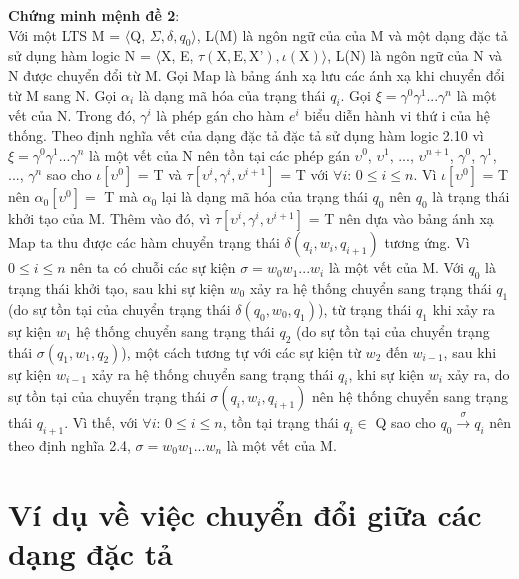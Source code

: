 \documentclass[a4paper,13pt,oneside,openany]{book}
\begin{document}
\begin{flushleft}
		\textbf{Chứng minh mệnh đề 2}:\\
		Với một LTS M = $\langle$Q, $\Sigma, \delta, q_0\rangle$, L(M) là ngôn ngữ của của M và một dạng đặc tả sử dụng hàm logic N = $\langle$X, E, $\tau(\textrm{X}, \textrm{E}, \textrm{X'}), \iota(\textrm{X})\rangle$, L(N) là ngôn ngữ của N và N được chuyển đổi từ M.
		Gọi Map là bảng ánh xạ lưu các ánh xạ khi chuyển đổi từ M sang N. Gọi $\alpha_i$ là dạng mã hóa của trạng thái $q_i$. Gọi $\xi = \gamma^0\gamma^1...\gamma^n$ là một vết của N. 
		Trong đó, $\gamma^i$ là phép gán cho hàm $e^i$ biểu diễn hành vi thứ i của hệ thống. Theo định nghĩa vết của dạng đặc tả đặc tả sử dụng hàm logic 2.10 vì $\xi = \gamma^0\gamma^1...\gamma^n$ là một vết của N nên tồn tại các phép gán $\upsilon^0$, $\upsilon^1$, ..., $\upsilon^{n+1}$, $\gamma^0$, $\gamma^1$, ..., $\gamma^n$ sao cho $\iota[\upsilon^0]$ = T và $\tau[\upsilon^i, \gamma^i, \upsilon^{i+1}]$ = T với $\forall i$: $0 \leq i \leq n$. Vì $\iota[\upsilon^0]$ = T nên $\alpha_0[\upsilon^0] =$ T mà $\alpha_0$ lại là dạng mã hóa của trạng thái $q_0$ nên $q_0$ là trạng thái khởi tạo của M. Thêm vào đó, vì $\tau[\upsilon^i, \gamma^i, \upsilon^{i+1}]$ = T nên dựa vào bảng ánh xạ Map ta thu được các hàm chuyển trạng thái $\delta(q_i, w_i, q_{i+1})$ tương ứng. Vì $0 \leq i \leq n$ nên ta có chuỗi các sự kiện $\sigma = w_0w_1...w_i$ là một vết của M. Với $q_0$ là trạng thái khởi tạo, sau khi sự kiện $w_0$ xảy ra hệ thống chuyển sang trạng thái $q_1$ (do sự tồn tại của chuyển trạng thái $\delta(q_0, w_0, q_1)$), từ trạng thái $q_1$ khi xảy ra sự kiện $w_1$ hệ thống chuyển sang trạng thái $q_2$ (do sự tồn tại của chuyển trạng thái $\sigma(q_1, w_1, q_2)$), một cách tương tự với các sự kiện từ $w_2$ đến $w_{i-1}$, sau khi sự kiện $w_{i-1}$ xảy ra hệ thống chuyển sang trạng thái $q_i$, khi sự kiện $w_i$ xảy ra, do sự tồn tại của chuyển trạng thái $\sigma(q_i, w_i, q_{i+1})$ nên hệ thống chuyển sang trạng thái $q_{i+1}$. Vì thế, với $\forall i$: $0 \leq i \leq n$, tồn tại trạng thái $q_i \in$ Q sao cho $q_0 \overset{\sigma}{\longrightarrow} q_{i}$ nên theo định nghĩa 2.4, $\sigma = w_0w_1...w_n$ là một vết của M.
	\chapter{Ví dụ về việc chuyển đổi giữa các dạng đặc tả}

\end{flushleft}
\end{document}
